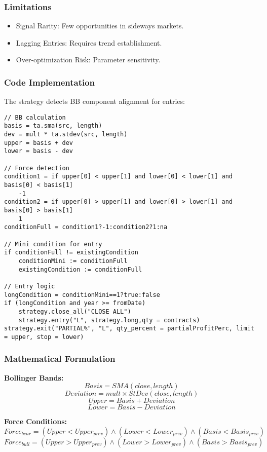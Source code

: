 \documentclass[12pt]{article}
\begin{document}
\subsubsection{Limitations}
\begin{itemize}
\item Signal Rarity: Few opportunities in sideways markets.
\item Lagging Entries: Requires trend establishment.
\item Over-optimization Risk: Parameter sensitivity.
\end{itemize}

\subsubsection{Code Implementation}
The strategy detects BB component alignment for entries:

\begin{lstlisting}[language=Pine, caption=Pine Script Code for STRG-BBForce]
// BB calculation
basis = ta.sma(src, length)
dev = mult * ta.stdev(src, length)
upper = basis + dev
lower = basis - dev

// Force detection
condition1 = if upper[0] < upper[1] and lower[0] < lower[1] and basis[0] < basis[1]
    -1
condition2 = if upper[0] > upper[1] and lower[0] > lower[1] and basis[0] > basis[1]
    1
conditionFull = condition1?-1:condition2?1:na

// Mini condition for entry
if conditionFull != existingCondition
    conditionMini := conditionFull
    existingCondition := conditionFull

// Entry logic
longCondition = conditionMini==1?true:false
if (longCondition and year >= fromDate)
    strategy.close_all("CLOSE ALL")
    strategy.entry("L", strategy.long,qty = contracts)
strategy.exit("PARTIAL%", "L", qty_percent = partialProfitPerc, limit = upper, stop = lower)
\end{lstlisting}

\subsubsection{Mathematical Formulation}
\textbf{Bollinger Bands:}
\[
Basis = SMA(close, length)
\]
\[
Deviation = mult \times StDev(close, length)
\]
\[
Upper = Basis + Deviation
\]
\[
Lower = Basis - Deviation
\]

\textbf{Force Conditions:}
\[
Force_{bear} = (Upper < Upper_{prev}) \land (Lower < Lower_{prev}) \land (Basis < Basis_{prev})
\]
\[
Force_{bull} = (Upper > Upper_{prev}) \land (Lower > Lower_{prev}) \land (Basis > Basis_{prev})
\]
\end{document}

